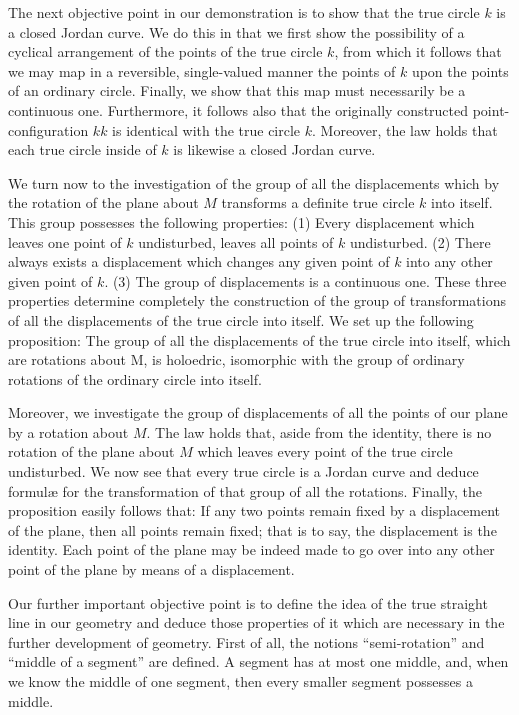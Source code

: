 \documentclass[11pt,oneside]{book}
\begin{document}
The next objective point in our demonstration is
to show that the true circle $k$ is a closed Jordan curve.
We do this in that we first show the possibility of a
cyclical arrangement of the points of the true circle
$k$, from which it follows that we may map in a reversible,
single-valued manner the points of $k$ upon
the points of an ordinary circle. Finally, we show
that this map must necessarily be a continuous one.
Furthermore, it follows also that the originally constructed
point-configuration $kk$ is identical with the
true circle $k$. Moreover, the law holds that each true
circle inside of $k$ is likewise a closed Jordan curve.

We turn now to the investigation of the group of
all the displacements which by the rotation of the
plane about $M$ transforms a definite true circle $k$ into
itself. This group possesses the following properties: (1) Every
displacement which leaves one point
of $k$ undisturbed, leaves all points of $k$ undisturbed.
(2) There always exists a displacement which changes
any given point of $k$ into any other given point of $k$.
(3) The group of displacements is a continuous one.
These three properties determine completely the construction
of the group of transformations of all the
displacements of the true circle into itself. We set up
the following proposition: The group of all the displacements
of the true circle into itself, which are rotations
about M, is holoedric, isomorphic with the
group of ordinary rotations of the ordinary circle into
itself.

Moreover, we investigate the group of displacements
of all the points of our plane by a rotation about
$M$. The law holds that, aside from the identity, there
is no rotation of the plane about $M$ which leaves every
point of the true circle undisturbed. We now see that
every true circle is a Jordan curve and deduce formul{\ae}
for the transformation of that group of all the rotations.
Finally, the proposition easily follows that: If
any two points remain fixed by a displacement of the
plane, then all points remain fixed; that is to say, the
displacement is the identity. Each point of the plane
may be indeed made to go over into any other point
of the plane by means of a displacement.

Our further important objective point is to define
the idea of the true straight line in our geometry and
deduce those properties of it which are necessary in
the further development of geometry. First of all, the
notions ``semi-rotation'' and ``middle of a segment''
are defined. A segment has at most one middle, and,
when we know the middle of one segment, then every
smaller segment possesses a middle.
\end{document}
